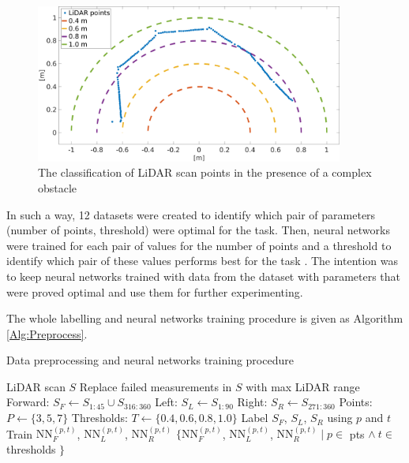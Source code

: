 \begin{figure}
    \centering
    \includegraphics[width=0.9\textwidth]{slike/thr.png}
    \caption{The classification of LiDAR scan points in the presence of a complex obstacle}
    \label{fig:Threshold}
\end{figure}

In such a way, 12 datasets were created to identify which pair of parameters (number of points, threshold) were optimal for the task. Then, neural networks were trained for each pair of values for the number of points and a threshold to identify which pair of these values performs best for the task \cite{Kruzic2018}. The intention was to keep neural networks trained with data from the dataset with parameters that were proved optimal and use them for further experimenting.

The whole labelling and neural networks training procedure is given as Algorithm \ref{Alg:Preprocess}.

\begin{algorithm}
\caption{Data preprocessing and neural networks training procedure}
\label{Alg:Preprocess}
\begin{algorithmic}
	\renewcommand{\algorithmicrequire}{\textbf{Input:}}
    \renewcommand{\algorithmicensure}{\textbf{Output:}}
    \REQUIRE LiDAR scan $S$
    \STATE Replace failed measurements in $S$ with max LiDAR range
    \STATE Forward: $S_F \gets S_{1:45} \cup S_{316:360}$
    \STATE Left: $S_L \gets S_{1:90}$
    \STATE Right: $S_R \gets S_{271:360}$
    \STATE Points: $P \gets \{3,5,7\}$
    \STATE Thresholds: $T \gets \{0.4, 0.6, 0.8, 1.0\}$
          \STATE Label $S_F$, $S_L$, $S_R$ using $p$ and $t$
          \STATE Train $\mathrm{NN}_F^{(p,t)}$, $\mathrm{NN}_L^{(p,t)}$, $\mathrm{NN}_R^{(p,t)}$
      \ENDFOR
    \ENDFOR
    \ENSURE $\{\mathrm{NN}_F^{(p,t)}$, $\mathrm{NN}_L^{(p,t)}$, $\mathrm{NN}_R^{(p,t)} \mid p \in $ pts $\land~t \in$ thresholds $\}$
\end{algorithmic}
\end{algorithm}


